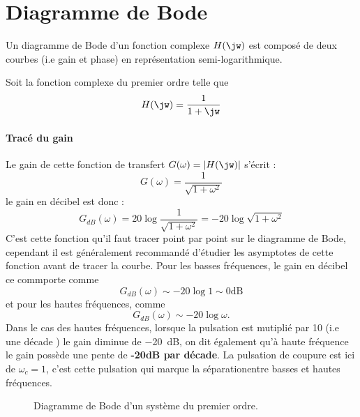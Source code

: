 \section{Diagramme de Bode}
Un diagramme de Bode d'un fonction complexe $H(\jw)$ est composé de deux 
courbes (i.e gain et phase) en représentation semi-logarithmique.

Soit la fonction complexe du premier ordre telle que 
\begin{align}
    H(\jw)=\dfrac{1}{1+\jw}\label{eq-ft_annexe}
\end{align}
\paragraph{Tracé du gain}
Le gain de cette fonction de transfert $G(\omega)=|H(\jw)|$ s'écrit :
\[
    G(\omega)=\dfrac{1}{\sqrt{1+\omega^2}}
\]
le gain en décibel est donc :
\[
    G_{dB}(\omega)=20\log{\dfrac{1}{\sqrt{1+\omega^2}}}
                  =-20\log{\sqrt{1+\omega^2}}
\]
C'est cette fonction qu'il faut tracer point par point sur le diagramme 
de Bode, cependant il est généralement recommandé d'étudier les asymptotes 
de cette fonction avant de tracer la courbe. Pour les basses fréquences, le 
gain en décibel ce commporte comme 
\[
    G_{dB}(\omega)\sim-20\log{1}\sim 0\text{dB}
\] 
et pour les hautes fréquences, comme
\[
    G_{dB}(\omega)\sim -20\log{\omega}.
\]
Dans le cas des hautes fréquences, lorsque la pulsation est mutiplié par 
10 (i.e une décade ) le gain diminue de \SI{-20}{\dB}, on dit également 
qu'à haute fréquence le gain possède une pente de \textbf{-20dB par décade}. 
La pulsation de coupure est ici de $\omega_{c}=1$, c'est cette pulsation qui 
marque la \og séparation\fg entre basses et hautes fréquences. 
\begin{figure}[!t]
    \centering
    
    
    \caption{Diagramme de Bode d'un système du premier ordre.
    \label{fig-bode_annexe}}
\end{figure}
